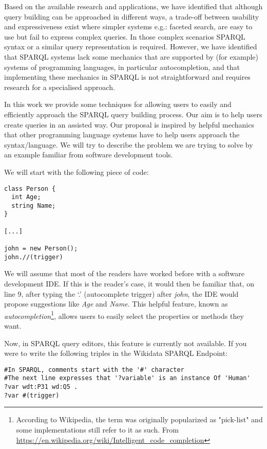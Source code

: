 Based on the available research and applications, we have identified that although query building can be approached in different ways, 
a trade-off between usability and expressiveness exist where simpler systems e.g.: 
faceted search, are easy to use but fail to express complex queries. 
In those complex scenarios SPARQL syntax or a similar query representation is required. 
However, we have identified that SPARQL systems lack some mechanics that are supported by (for example) systems of programming languages, 
in particular autocompletion, and that implementing these mechanics in SPARQL is not straightforward and requires research for a specialised approach.

In this work we provide some techniques for allowing users to easily and efficiently approach the SPARQL query building process. 
Our aim is to help users create queries in an assisted way. 
Our proposal is inspired by helpful mechanics that other programming language systems have to help users approach the syntax/language. 
We will try to describe the problem we are trying to solve by an example familiar from software development tools.

We will start with the following piece of code:
\begin{verbatim}
class Person {
  int Age;
  string Name;
}

[...]

john = new Person();
john.//(trigger)
\end{verbatim}

We will assume that most of the readers have worked before with a software development IDE. 
If this is the reader’s case, it would then be familiar that, on line 9, after typing the ‘.’ (autocomplete trigger) after \textit{john}, 
the IDE would propose suggestions like \textit{Age} and \textit{Name}. 
This helpful feature, known as \textit{autocompletion}\footnote{According to Wikipedia, the term was originally popularized as "pick-list" and some implementations still refer to it as such. 
From \url{https://en.wikipedia.org/wiki/Intelligent_code_completion}}, allows users to easily select the properties or methods they want. 

Now, in SPARQL query editors, this feature is currently not available. 
If you were to write the following triples in the Wikidata SPARQL Endpoint:

\begin{verbatim}
#In SPARQL, comments start with the '#' character
#The next line expresses that '?variable' is an instance Of 'Human' 
?var wdt:P31 wd:Q5 .
?var #(trigger)
\end{verbatim}


